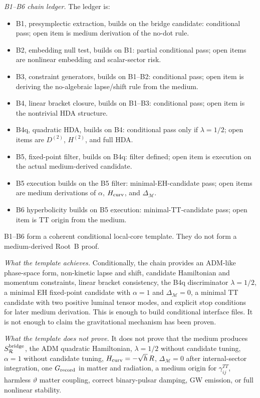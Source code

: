 \documentclass[11pt]{article}
\begin{document}
\medskip\noindent\textit{B1--B6 chain ledger.}
The ledger is:
\begin{itemize}
\item B1, presymplectic extraction, builds on the bridge candidate:
  conditional pass; open item is medium derivation of the no-dot rule.
\item B2, embedding null test, builds on B1: partial conditional pass; open
  items are nonlinear embedding and scalar-sector risk.
\item B3, constraint generators, builds on B1--B2: conditional pass; open item
  is deriving the no-algebraic lapse/shift rule from the medium.
\item B4, linear bracket closure, builds on B1--B3: conditional pass; open
  item is the nontrivial HDA structure.
\item B4q, quadratic HDA, builds on B4: conditional pass only if
  \(\lambda=1/2\); open items are \(D^{(2)}\), \(H^{(2)}\), and full HDA.
\item B5, fixed-point filter, builds on B4q: filter defined; open item is
  execution on the actual medium-derived candidate.
\item B5 execution builds on the B5 filter: minimal-EH-candidate pass; open
  items are medium derivations of \(\alpha\), \(H_{\rm curv}\), and
  \(\Delta_{\mathcal M}\).
\item B6 hyperbolicity builds on B5 execution: minimal-TT-candidate pass; open
  item is TT origin from the medium.
\end{itemize}
B1--B6 form a coherent conditional local-core template.  They do not form a
medium-derived Root~B proof.

\medskip\noindent\textit{What the template achieves.}
Conditionally, the chain provides an ADM-like phase-space form, non-kinetic
lapse and shift, candidate Hamiltonian and momentum constraints, linear
bracket consistency, the B4q discriminator \(\lambda=1/2\), a minimal EH
fixed-point candidate with \(\alpha=1\) and
\(\Delta_{\mathcal M}=0\), a minimal TT candidate with two positive luminal
tensor modes, and explicit stop conditions for later medium derivation.  This
is enough to build conditional interface files.  It is not enough to claim the
gravitational mechanism has been proven.

\medskip\noindent\textit{What the template does not prove.}
It does not prove that the medium produces \(S_{\mathcal R}^{\rm bridge}\),
the ADM quadratic Hamiltonian, \(\lambda=1/2\) without candidate tuning,
\(\alpha=1\) without candidate tuning, \(H_{\rm curv}=-\sqrt h\,R\),
\(\Delta_{\mathcal M}=0\) after internal-sector integration, one
\(G_{\rm record}\) in matter and radiation, a medium origin for
\(\gamma^{TT}_{ij}\), harmless \(\vartheta\) matter coupling, correct
binary-pulsar damping, GW emission, or full nonlinear stability.
\end{document}
